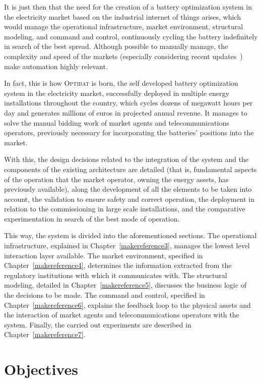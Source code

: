 It is just then that the need for the creation of a battery optimization system in the electricity market based on the industrial internet of things arises, which would manage the operational infrastructure, market environment, structural modeling, and command and control, continuously cycling the battery indefinitely in search of the best spread. Although possible to manually manage, the complexity and speed of the markets (especially considering recent updates~\cite{cnmc2025resolucion, omie2025instruccion}) make automation highly relevant.

In fact, this is how \textsc{Optibat} is born, the self developed battery optimization system in the electricity market, successfully deployed in multiple energy installations throughout the country, which cycles dozens of megawatt hours per day and generates millions of euros in projected annual revenue. It manages to solve the manual bidding work of market agents and telecommunications operators, previously necessary for incorporating the batteries' positions into the market.

With this, the design decisions related to the integration of the system and the components of the existing architecture are detailed (that is, fundamental aspects of the operation that the market operator, owning the energy assets, has previously available), along the development of all the elements to be taken into account, the validation to ensure safety and correct operation, the deployment in relation to the commissioning in large scale installations, and the comparative experimentation in search of the best mode of operation.

This way, the system is divided into the aforementioned sections. The operational infrastructure, explained in Chapter~\ref{makereference3}, manages the lowest level interaction layer available. The market environment, specified in Chapter~\ref{makereference4}, determines the information extracted from the regulatory institutions with which it communicates with. The structural modeling, detailed in Chapter~\ref{makereference5}, discusses the business logic of the decisions to be made. The command and control, specified in Chapter~\ref{makereference6}, explains the feedback loop to the physical assets and the interaction of market agents and telecommunications operators with the system. Finally, the carried out experiments are described in Chapter~\ref{makereference7}.

\section{Objectives}
\label{makereference9.1}


